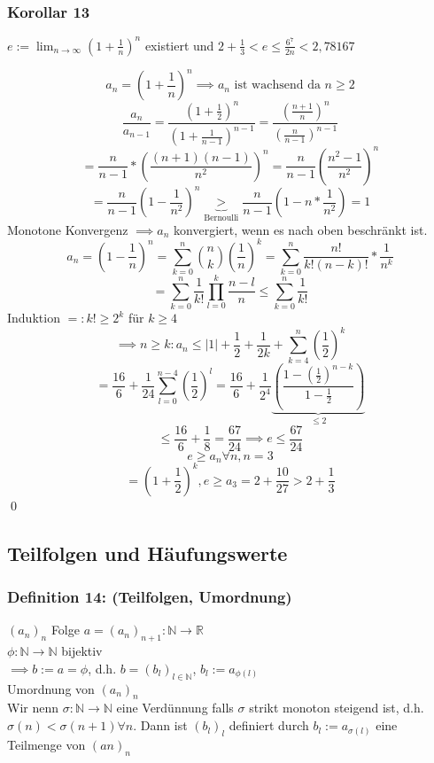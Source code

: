 \documentclass[fleqn]{scrartcl}
\renewenvironment{proof}{{\bfseries Beweis }}{\qed}
\begin{document}
\subsubsection{Korollar 13}
$e := \lim_{n \rightarrow \infty} (1 + \frac{1}{n})^n$ existiert und $2 + \frac{1}{3} < e \leq \frac{6^7}{2n} < 2,78167$

\begin{proof}
$$a_n = (1 + \frac{1}{n})^n \implies a_n\text{ ist wachsend da } n\geq 2$$
$$\frac{a_n}{a_{n-1}} = \frac{(1+\frac{1}{2})^n}{(1+\frac{1}{n-1})^{n-1}} = \frac{(\frac{n+1}{n})^n}{(\frac{n}{n-1})^{n-1}}$$
$$= \frac{n}{n-1} * (\frac{(n+1)(n-1)}{n^2})^n = \frac{n}{n-1} (\frac{n^2 - 1}{n^2})^n$$
$$= \frac{n}{n-1} (1-\frac{1}{n^2})^n \underbrace{>}_{\text{Bernoulli}} \frac{n}{n-1} (1 - n * \frac{1}{n^2}) = 1$$
Monotone Konvergenz $\implies a_n$ konvergiert, wenn es nach oben beschränkt ist.
$$a_n = (1 - \frac{1}{n})^n = \sum_{k = 0}^n \binom{n}{k} (\frac{1}{n})^k = \sum_{k=0}^n \frac{n!}{k!(n-k)!} * \frac{1}{n^k}$$
$$= \sum_{k =0}^n \frac{1}{k!} \prod_{l=0}^k \frac{n-l}{n} \leq \sum_{k=0}^n \frac{1}{k!}$$
Induktion $=: k! \geq 2^k$ für $k\geq 4$\\
$$\implies n \geq k: a_n \leq |1| + \frac{1}{2} +  \frac{1}{2k} + \sum_{k = 4}^n (\frac{1}{2})^k$$
$$= \frac{16}{6} + \frac{1}{24} \sum_{l = 0}^{n-4} (\frac{1}{2})^l = \frac{16}{6} + \frac{1}{2^4} \underbrace{(\frac{1-(\frac{1}{2})^{n-k}}{1-\frac{1}{2}})}_{\leq 2}$$
$$\leq \frac{16}{6} + \frac{1}{8} = \frac{67}{24} \implies e \leq \frac{67}{24}$$
$$e \geq a_n \forall n, n = 3$$
$$=(1 + \frac{1}{2})^k, e \geq a_3 = 2 + \frac{10}{27} > 2 + \frac{1}{3}$$
\end{proof}
\subsection{Teilfolgen und Häufungswerte}
\subsubsection{Definition 14: (Teilfolgen, Umordnung)} $(a_n)_n$ Folge $a = (a_n)_{n+1}: \mathbb{N} \rightarrow \mathbb{R}$\\
$\phi : \mathbb{N} \rightarrow \mathbb{N}$ bijektiv\\
$\implies b:= a = \phi$, d.h. $b = (b_l)_{l\in\mathbb{N}}$, $b_l := a_{\phi (l)}$\\
Umordnung von $(a_n)_n$\\
Wir nenn $\sigma : \mathbb{N} \rightarrow \mathbb{N}$ eine Verdünnung falls $\sigma$ strikt monoton steigend ist, d.h. $\sigma (n) < \sigma (n+1) \forall n$. Dann ist $(b_l)_l$ definiert durch $b_l := a_{\sigma (l)}$ eine Teilmenge von $(an)_n$
\end{document}
